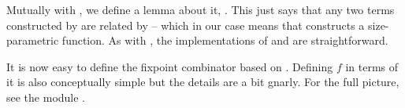 Mutually with , we define a lemma about it,
. This just says that any two terms constructed by
 are related by  -- which in our case means that
 constructs a size-parametric function. As with
, the implementations of  and
 are straightforward.

It is now easy to define the fixpoint combinator  based on
. Defining $f$ in terms of it is also conceptually simple but
the details are a bit gnarly. For the full picture, see the module
.
